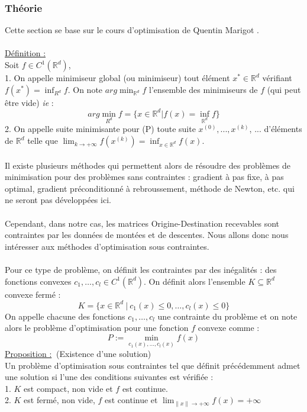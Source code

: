 \documentclass[12pt]{article}
\newcommand{\R}{\mathbb{R}}
\newcommand{\Rd}{\mathbb{R}^d}
\newcommand{\defin}{\underline{Définition :}}
\newcommand{\prop}{\underline{Proposition :}}
\begin{document}
\subsubsection{Théorie}
\label{theorie optimisation}
Cette section se base sur le cours d'optimisation de Quentin Marigot \cite{poly_quentin_marigot}.\\
\\
\defin$\:$\\
Soit $f \in C^1(\Rd)$,\\
1. On appelle minimiseur global (ou minimiseur) tout élément $x^* \in \R^d$ vérifiant $f(x^*) = \inf_{R^d}f$. On note $arg \min_{\Rd} f$ l'ensemble des minimiseurs de $f$ (qui peut être vide) \textit{ie} : 
\[
arg \min_{R^d} f = \{ x \in \Rd | f(x) = \inf_{\Rd} f\}
\]
2. On appelle suite minimisante pour (P) toute suite $x^{(0)}, ..., x^{(k)}$, ... d'éléments de $\Rd$ telle que $\lim_{k\to+\infty} f(x^{(k)}) = \inf_{x \in \Rd} f(x)$.\\
\\
Il existe plusieurs méthodes qui permettent alors de résoudre des problèmes de minimisation pour des problèmes sans contraintes : gradient à pas fixe, à pas optimal, gradient préconditionné à rebroussement, méthode de Newton, etc. qui ne seront pas développées ici.\\
\\
Cependant, dans notre cas, les matrices Origine-Destination recevables sont contraintes par les données de montées et de descentes. Nous allons donc nous intéresser aux méthodes d'optimisation sous contraintes.\\
\\
Pour ce type de problème, on définit les contraintes par des inégalités : des fonctions convexes $c_1, \dots, c_l \in C^1(\Rd)$. On définit alors l'ensemble $K \subseteq \Rd$ convexe fermé : 
\[K = \{x \in \Rd \:|\: c_1(x) \leq 0, \dots, c_l(x) \leq 0 \}\] 
On appelle chacune des fonctions $c_1, \dots, c_l$ une contrainte du problème et on note alors le problème d'optimisation pour une fonction $f$ convexe comme :
\[
P := \min_{c_1(x), \dots, c_l(x)} f(x)
\]
\prop $\:$ (Existence d'une solution)\\
Un problème d'optimisation sous contraintes tel que définit précédemment admet une solution si l'une des conditions suivantes est vérifiée :\\
1. $K$ est compact, non vide et $f$ est continue.\\
2. $K$ est fermé, non vide, $f$ est continue et $\lim_{\lVert x\lVert \to +\infty} f(x) = +\infty$\\
\end{document}

